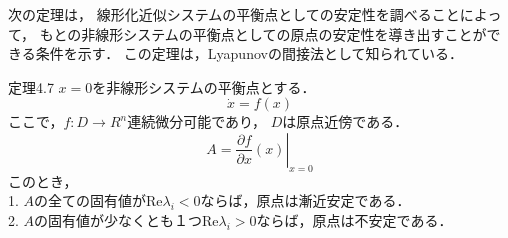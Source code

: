 \documentclass{jsarticle}
\begin{document}
次の定理は，
線形化近似システムの平衡点としての安定性を調べることによって，
もとの非線形システムの平衡点としての原点の安定性を導き出すことができる条件を示す．
この定理は，Lyapunovの間接法として知られている．
\begin{itembox}[l]{定理4.7}
  $x=0$を非線形システムの平衡点とする．
  \begin{equation*}
    \dot x = f(x)
  \end{equation*}
  ここで，$f:D\rightarrow R^n$連続微分可能であり，
  $D$は原点近傍である．
  \begin{equation*}
    A = \left.\frac{\partial f}{\partial x}(x)\right|_{x=0}
  \end{equation*}
  このとき，\\
  1. $A$の全ての固有値が$\text{Re}\lambda_i <0$ならば，原点は漸近安定である．\\
  2. $A$の固有値が少なくとも１つ$\text{Re}\lambda_i >0$ならば，原点は不安定である．
\end{itembox}
\end{document}
